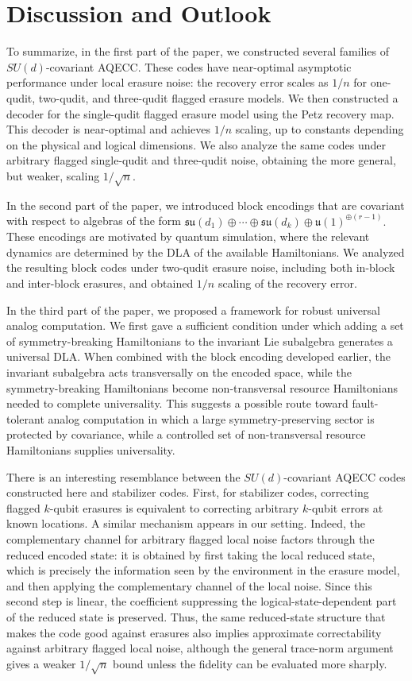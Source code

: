 \documentclass[10pt,twocolumn,superscriptaddress,aps,amsmath,amssymb,citeautoscript,floatfix,prx,longbibliography]{revtex4-2}
\newcounter{alg}
\theoremstyle{plain}
\theoremstyle{plain}
\theoremstyle{plain}
\theoremstyle{plain}
\theoremstyle{plain}
\theoremstyle{plain}
\begin{document}
\section{Discussion and Outlook}\label{sec:main_disc}

To summarize, in the first part of the paper, we constructed several families of \(SU(d)\)-covariant AQECC. These codes have near-optimal asymptotic performance under local erasure noise: the recovery error scales
as \(1/n\) for one-qudit, two-qudit, and three-qudit flagged erasure models. We then constructed a decoder for the single-qudit flagged erasure model using the Petz recovery map. This decoder is near-optimal and achieves \(1/n\) scaling, up to constants depending on the physical and logical dimensions. We also analyze the same codes
under arbitrary flagged single-qudit and three-qudit noise, obtaining the more general, but weaker, scaling \(1/\sqrt n\).

In the second part of the paper, we introduced block encodings that are covariant with respect to algebras of the form
$
    \mathfrak{su}(d_1)\oplus\cdots\oplus\mathfrak{su}(d_k)
    \oplus
    \mathfrak{u}(1)^{\oplus(r-1)}.
$
These encodings are motivated by quantum simulation, where the relevant dynamics are determined by the DLA of the available
Hamiltonians. We analyzed the resulting block codes under two-qudit erasure noise, including both in-block and inter-block erasures, and obtained \(1/n\) scaling of the recovery error.

In the third part of the paper, we proposed a framework for robust universal analog computation. We first gave a sufficient condition under which adding a set of symmetry-breaking Hamiltonians to the invariant Lie subalgebra generates a universal DLA. When combined with the block encoding developed
earlier, the invariant subalgebra acts transversally on the encoded space, while the symmetry-breaking Hamiltonians become non-transversal resource Hamiltonians needed to complete universality. This suggests a possible route toward fault-tolerant analog computation in which a large symmetry-preserving sector is protected by covariance, while a controlled
set of non-transversal resource Hamiltonians supplies universality.

There is an interesting resemblance between the \(SU(d)\)-covariant AQECC codes constructed here and stabilizer codes. First, for stabilizer codes, correcting flagged \(k\)-qubit erasures is equivalent to correcting arbitrary \(k\)-qubit errors at known locations. A similar mechanism
appears in our setting. Indeed, the complementary channel for arbitrary flagged local noise factors through the reduced encoded state: it is obtained by first taking the local reduced state, which is precisely the information seen by the environment in the erasure model, and then applying the complementary channel of
the local noise. Since this second step is linear, the coefficient suppressing the logical-state-dependent part of the reduced state is preserved. Thus, the same reduced-state structure that makes the code good against erasures also implies approximate correctability against arbitrary flagged local noise, although the general trace-norm argument gives a weaker \(1/\sqrt n\) bound unless the
fidelity can be evaluated more sharply.
\end{document}
